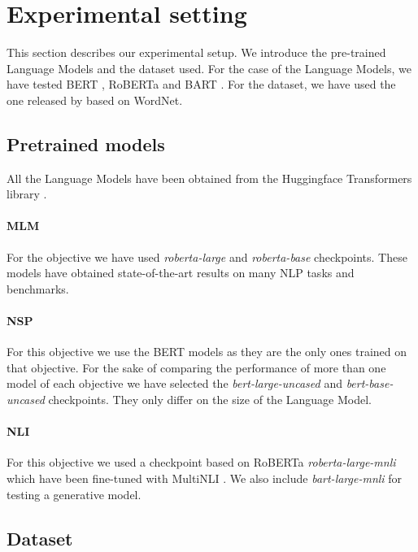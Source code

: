 \documentclass[11pt]{article}
\begin{document}
\section{Experimental setting}
\label{experimental-setting}

This section describes our experimental setup. We introduce the pre-trained Language Models and the dataset used. For the case of the Language Models, we have tested BERT \cite{bert}, RoBERTa \cite{ROBERTA} and BART \cite{BART}.  For the dataset, we have used the one released by \citet{camacho2016} based on WordNet.

\subsection{Pretrained models}

All the Language Models have been obtained from the Huggingface Transformers library \cite{transformers}.

\paragraph{MLM} For the objective we have used \textit{roberta-large} and \textit{roberta-base} checkpoints. These models have obtained state-of-the-art results on many NLP tasks and benchmarks. 

\paragraph{NSP} For this objective we use the BERT models as they are the only ones trained on that objective. For the sake of comparing the performance of more than one model of each objective we have selected the \textit{bert-large-uncased} and \textit{bert-base-uncased} checkpoints. They only differ on the size of the Language Model.

\paragraph{NLI} For this objective we used a checkpoint based on RoBERTa \textit{roberta-large-mnli} which have been fine-tuned with MultiNLI \cite{williams2018broad}. We also include \textit{bart-large-mnli} for testing a generative model.

\subsection{Dataset}
\end{document}
